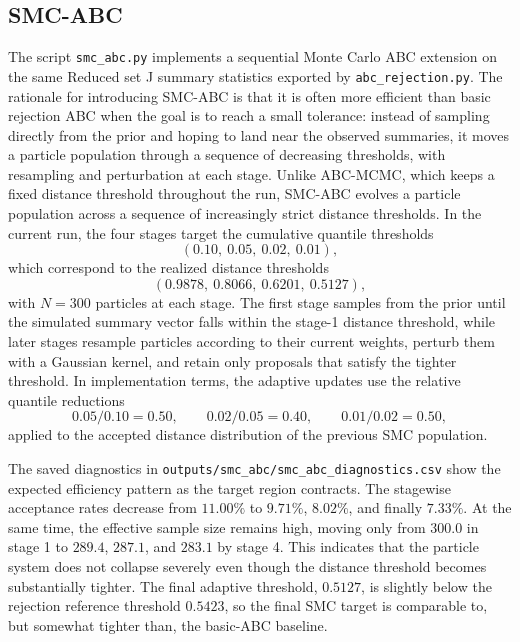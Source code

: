 \documentclass[11pt]{article}
\begin{document}
\subsection{SMC-ABC}

The script \texttt{smc\_abc.py} implements a sequential Monte Carlo ABC extension \citep{beaumont2009} on the same Reduced set J summary statistics exported by \texttt{abc\_rejection.py}. The rationale for introducing SMC-ABC is that it is often more efficient than basic rejection ABC when the goal is to reach a small tolerance: instead of sampling directly from the prior and hoping to land near the observed summaries, it moves a particle population through a sequence of decreasing thresholds, with resampling and perturbation at each stage. Unlike ABC-MCMC, which keeps a fixed distance threshold throughout the run, SMC-ABC evolves a particle population across a sequence of increasingly strict distance thresholds. In the current run, the four stages target the cumulative quantile thresholds
\[
(0.10,\ 0.05,\ 0.02,\ 0.01),
\]
which correspond to the realized distance thresholds
\[
(0.9878,\ 0.8066,\ 0.6201,\ 0.5127),
\]
with $N=300$ particles at each stage. The first stage samples from the prior until the simulated summary vector falls within the stage-1 distance threshold, while later stages resample particles according to their current weights, perturb them with a Gaussian kernel, and retain only proposals that satisfy the tighter threshold. In implementation terms, the adaptive updates use the relative quantile reductions
\[
0.05/0.10 = 0.50, \qquad 0.02/0.05 = 0.40, \qquad 0.01/0.02 = 0.50,
\]
applied to the accepted distance distribution of the previous SMC population.

The saved diagnostics in \texttt{outputs/smc\_abc/smc\_abc\_diagnostics.csv} show the expected efficiency pattern as the target region contracts. The stagewise acceptance rates decrease from $11.00\%$ to $9.71\%$, $8.02\%$, and finally $7.33\%$. At the same time, the effective sample size remains high, moving only from $300.0$ in stage 1 to $289.4$, $287.1$, and $283.1$ by stage 4. This indicates that the particle system does not collapse severely even though the distance threshold becomes substantially tighter. The final adaptive threshold, $0.5127$, is slightly below the rejection reference threshold $0.5423$, so the final SMC target is comparable to, but somewhat tighter than, the basic-ABC baseline.
\end{document}

